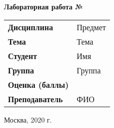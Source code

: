 \begin{center}
    \textbf{Лабораторная работа №} \\
    \vspace{0.5cm}
\end{center}

\vspace{4cm}

\begin{flushleft}
    \begin{tabular}{ll}
        \textbf{Дисциплина} & Предмет \\
        \textbf{Тема} & Тема\\
        \textbf{Студент} & Имя \\
        \textbf{Группа} & Группа \\
        \textbf{Оценка (баллы)} & \\
        \textbf{Преподаватель} & ФИО \\
    \end{tabular}
\end{flushleft}

\vspace{4cm}

\begin{center}
    Москва, 2020 г.
\end{center}
